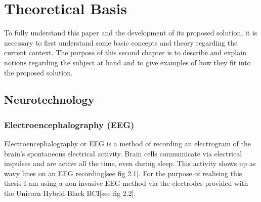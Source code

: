 
\chapter{Theoretical Basis}\label{cap:theory}
To fully understand this paper and the development of its proposed solution, it is necessary to first understand some basic concepts and theory regarding the current context. The purpose of this second chapter is to describe and explain notions regarding the subject at hand and to give examples of how they fit into the proposed solution.


\section{Neurotechnology}
\subsection{Electroencephalography (EEG)}
Electroencephalography or EEG is a method of recording an electrogram of the brain's spontaneous electrical activity. Brain cells communicate via electrical impulses and are active all the time, even during sleep\cite{EEG_mayoclinic}. This activity shows up as wavy lines on an EEG recording[see fig 2.1]. For the purpose of realising this thesis I am using a non-invasive EEG method via the electrodes provided with the Unicorn Hybrid Black BCI[see fig 2.2].

